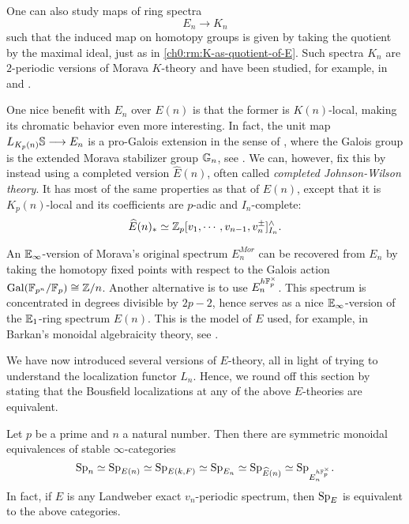 \begin{remark}
    One can also study maps of ring spectra 
    \[E_n \longrightarrow K_n\] 
    such that the induced map on homotopy groups is given by taking the quotient by the maximal ideal, just as in \cref{ch0:rm:K-as-quotient-of-E}. Such spectra $K_n$ are $2$-periodic versions of Morava $K$-theory and have been studied, for example, in \cite{hopkins-lurie_17} and \cite{barthel-pstragowski_2021}. 
\end{remark}

\begin{remark}
    One nice benefit with $E_n$ over $E(n)$ is that the former is $K(n)$-local, making its chromatic behavior even more interesting. In fact, the unit map $L_{K_p(n)}\S \longrightarrow E_n$ is a pro-Galois extension in the sense of \cite{rognes_08}, where the Galois group is the extended Morava stabilizer group $\G_n$, see \cite{devinatz-hopkins_2004}. We can, however, fix this by instead using a completed version $\widehat{E}(n)$, often called \emph{completed Johnson-Wilson theory}. It has most of the same properties as that of $E(n)$, except that it is $K_p(n)$-local and its coefficients are $p$-adic and $I_n$-complete: 
    \[\widehat{E}(n)_* \simeq \Z_p[v_1, \cdots, v_{n-1}, v_n^{\pm}]^\wedge_{I_n}.\]
\end{remark}

\begin{remark}
    An $\E_\infty$-version of Morava's original spectrum $E_n^{Mor}$ can be recovered from $E_n$ by taking the homotopy fixed points with respect to the Galois action $\mathrm{Gal}(\F_{p^n}/\F_p)\cong \Z/n$. Another alternative is to use $E_n^{h\F_p^\times}$. This spectrum is concentrated in degrees divisible by $2p-2$, hence serves as a nice $\E_\infty$-version of the $\E_1$-ring spectrum $E(n)$. This is the model of $E$ used, for example, in Barkan's monoidal algebraicity theory, see \cite{barkan_2023}. 
\end{remark}

We have now introduced several versions of $E$-theory, all in light of trying to understand the localization functor $L_n$. Hence, we round off this section by stating that the Bousfield localizations at any of the above $E$-theories are equivalent. 

\begin{proposition}
    \label{ch0:prop:all-E-local-cats-are-equivalent}
    Let $p$ be a prime and $n$ a natural number. Then there are symmetric monoidal equivalences of stable $\infty$-categories 
    \[\sp_n \simeq \sp_{E(n)} \simeq \sp_{E(k,F)}\simeq \sp_{E_n} \simeq \sp_{\widehat{E}(n)}\simeq \sp_{E_n^{h\F_p^\times}}.\]
    In fact, if $E$ is any Landweber exact $v_n$-periodic spectrum, then $\sp_E$ is equivalent to the above categories. 
\end{proposition}

